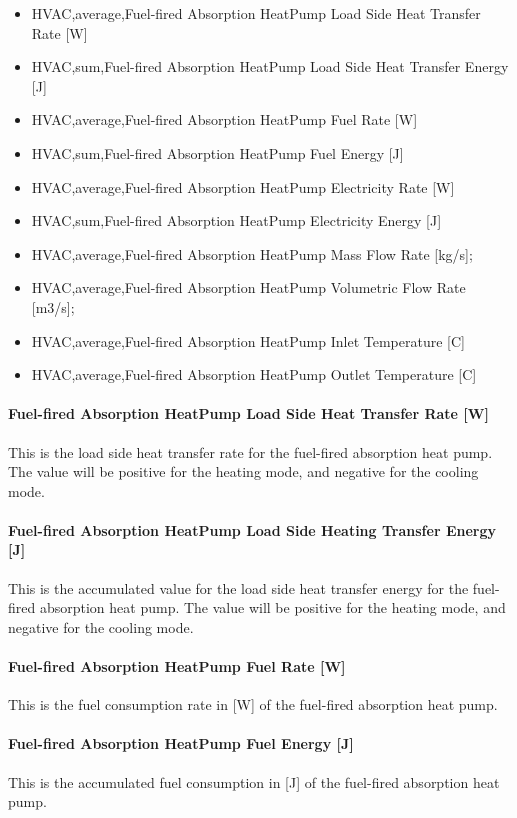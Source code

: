 \begin{itemize}
\item HVAC,average,Fuel-fired Absorption HeatPump Load Side Heat Transfer Rate [W]
\item HVAC,sum,Fuel-fired Absorption HeatPump Load Side Heat Transfer Energy [J]
\item HVAC,average,Fuel-fired Absorption HeatPump Fuel Rate [W]
\item HVAC,sum,Fuel-fired Absorption HeatPump Fuel Energy [J]
\item HVAC,average,Fuel-fired Absorption HeatPump Electricity Rate [W]
\item HVAC,sum,Fuel-fired Absorption HeatPump Electricity Energy [J]
\item HVAC,average,Fuel-fired Absorption HeatPump Mass Flow Rate [kg/s];
\item HVAC,average,Fuel-fired Absorption HeatPump Volumetric Flow Rate [m3/s];
\item HVAC,average,Fuel-fired Absorption HeatPump Inlet Temperature [C]
\item HVAC,average,Fuel-fired Absorption HeatPump Outlet Temperature [C]
\end{itemize}

\paragraph{Fuel-fired Absorption HeatPump Load Side Heat Transfer Rate [W]}
This is the load side heat transfer rate for the fuel-fired absorption heat pump. The value will be positive for the heating mode, and negative for the cooling mode.

\paragraph{Fuel-fired Absorption HeatPump Load Side Heating Transfer Energy [J]}
This is the accumulated value for the load side heat transfer energy for the fuel-fired absorption heat pump. The value will be positive for the heating mode, and negative for the cooling mode.

\paragraph{Fuel-fired Absorption HeatPump Fuel Rate [W]}
This is the fuel consumption rate in [W] of the fuel-fired absorption heat pump.

\paragraph{Fuel-fired Absorption HeatPump Fuel Energy [J]}
This is the accumulated fuel consumption in [J] of the fuel-fired absorption heat pump.

